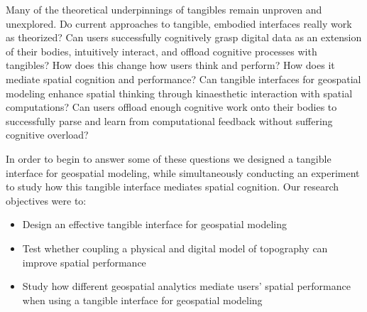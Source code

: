 \documentclass[prodmode,acmtochi]{acmsmall} %
\begin{document}
Many of the theoretical underpinnings of tangibles 
remain unproven and unexplored. 
Do current approaches to tangible, embodied interfaces
really work as theorized? 
Can users successfully
cognitively grasp digital data as an extension of their bodies,
intuitively interact, 
and offload cognitive processes
with tangibles?
How does this change how users think and perform?
How does it mediate spatial cognition and performance? 
Can tangible interfaces for geospatial modeling 
enhance spatial thinking
through kinaesthetic interaction with 
spatial computations?
Can users offload enough cognitive work onto their bodies
to successfully parse and learn from computational feedback
without suffering cognitive overload?

In order to begin to answer some of these questions we 
designed a tangible interface for geospatial modeling, 
while simultaneously conducting an experiment
to study how this tangible interface mediates spatial cognition.
%
Our research objectives were to:
%
\begin{itemize}
\item Design an effective tangible interface for geospatial modeling
\item Test whether coupling a physical and digital model of topography can improve spatial performance
\item Study how different geospatial analytics mediate users' spatial performance when using a tangible interface for geospatial modeling
\end{itemize}
\end{document}
